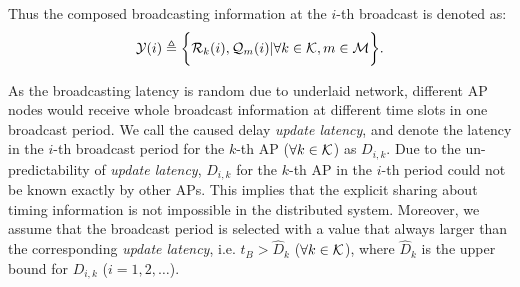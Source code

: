 Thus the composed broadcasting information at the $i$-th broadcast is denoted as:
\begin{align}
    \mathcal{Y}(i) \triangleq
        \bigg\{
            \mathcal{R}_{k}(i), \mathcal{Q}_{m}(i) | \forall k\in\mathcal{K}, m\in\mathcal{M}
        \bigg\}.
\end{align}

As the broadcasting latency is random due to underlaid network, different AP nodes would receive whole broadcast information at different time slots in one broadcast period.
We call the caused delay \emph{update latency}, and denote the latency in the $i$-th broadcast period for the $k$-th AP ($\forall k\in\mathcal{K}$) as $D_{i,k}$.
Due to the un-predictability of \emph{update latency}, $D_{i,k}$ for the $k$-th AP in the $i$-th period could not be known exactly by other APs. This implies that the explicit sharing about timing information is not impossible in the distributed system.
Moreover, we assume that the broadcast period is selected with a value that always larger than the corresponding \emph{update latency}, i.e. $t_B > \hat{D}_k$ ($\forall k\in\mathcal{K}$), where $\hat{D}_k$ is the upper bound for $D_{i,k}$ ($i=1,2,\dots$).


